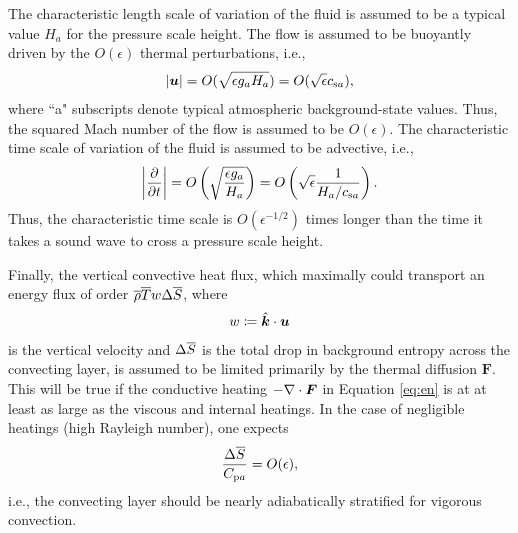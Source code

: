 \documentclass[12pt]{article}
\newcommand{\vecf}{\bm{F}}
\newcommand{\veck}{\hat{\bm{k}}}
\begin{document}
	The characteristic length scale of variation of the fluid is assumed to be a typical value $H_a$ for the pressure scale height. The flow is assumed to be buoyantly driven by the $O(\epsilon)$ thermal perturbations, i.e., 
	\begin{align}\label{eq:scaleu}
		|\bm{u}| = O(\sqrt{\epsilon g_a H_a}) = O(\sqrt{\epsilon}c_{{\rm s}a}),
	\end{align}
	where ``a" subscripts denote typical atmospheric background-state values. Thus, the squared Mach number of the flow is assumed to be $O(\epsilon)$. The characteristic time scale of variation of the fluid is assumed to be advective, i.e., 
	\begin{align}\label{eq:scaleu}
	\left|\frac{\partial}{\partial t}\right| = O\left(\sqrt{\frac{\epsilon g_a}{H_a}}\right) = O\left(\sqrt{\epsilon} \frac{1}{H_a/c_{{\rm s}a}}\right).
	\end{align}
	Thus, the characteristic time scale is $O(\epsilon^{-1/2})$ times longer than the time it takes a sound wave to cross a pressure scale height. 
	
	Finally, the vertical convective heat flux, which maximally could transport an energy flux of order $\overline{\rho} \overline{T} w \Delta\overline{S}$, where 
	\begin{align}\label{eq:defw}
		w\define\veck\cdot\vecu
	\end{align} is the vertical velocity and $\Delta \overline{S} $ is the total drop in background entropy across the convecting layer, is assumed to be limited primarily by the thermal diffusion $\vecf$. This will be true if the conductive heating $-\Div \vecf$ in Equation \eqref{eq:en} is at at least as large as the viscous and internal heatings. In the case of negligible heatings (high Rayleigh number), one expects
	\begin{align}
		\frac{\Delta\overline{S}}{C_{{\rm p}a}} = O(\epsilon),
	\end{align}
	i.e., the convecting layer should be nearly adiabatically stratified for vigorous convection. 
	
\end{document}
